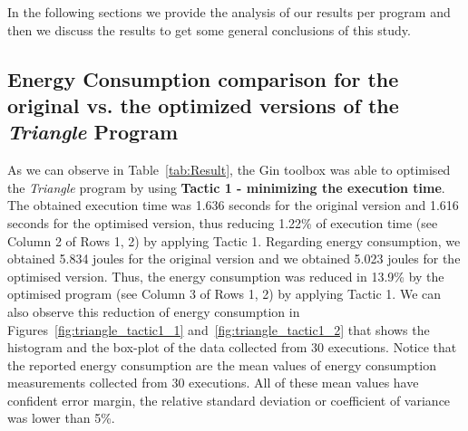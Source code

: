 \vspace{.5em}
In the following sections we provide the analysis of our results per program and then we discuss the results to get some general conclusions of this study.

\vspace{-5pt}
\subsection{Energy Consumption comparison for the original vs. the optimized versions of the \textit{Triangle} Program}

As we can observe in Table~\ref{tab:Result}, the Gin toolbox was able to optimised the \textit{Triangle} program by using \textbf{Tactic 1 - minimizing the execution time}. The obtained execution time was 1.636 seconds for the original version and 1.616 seconds for the optimised version, thus reducing 1.22\% of execution time (see Column 2 of Rows 1, 2) by applying Tactic 1. 
Regarding energy consumption, we obtained 5.834 joules for the original version and we obtained 5.023 joules for the optimised version. Thus, the energy consumption was reduced in 13.9\% by the optimised program (see Column 3 of Rows 1, 2) by applying Tactic 1.  
We can also observe this reduction of energy consumption in Figures~\ref{fig:triangle_tactic1_1} and~\ref{fig:triangle_tactic1_2} that shows the histogram and the box-plot of the data collected from 30 executions. Notice that the reported energy consumption are the mean values of energy consumption measurements collected from 30 executions. All of these mean values have confident error margin, \ie the relative standard deviation or coefficient of variance was lower than 5\%.


